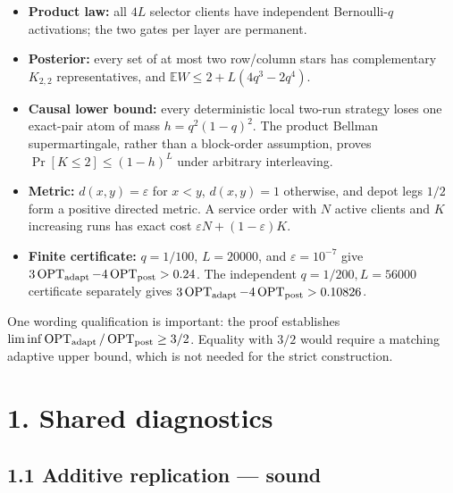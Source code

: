 \documentclass[11pt,a4paper]{article}
\begin{document}
\begin{itemize}

\item \textbf{Product law:} all \(4L\) selector clients have independent Bernoulli-\(q\) activations; the two gates per layer are permanent.

\item \textbf{Posterior:} every set of at most two row/column stars has complementary \(K_{2,2}\) representatives, and \(\mathbb E W\le2+L(4q^3-2q^4)\).

\item \textbf{Causal lower bound:} every deterministic local two-run strategy loses one exact-pair atom of mass \(h=q^2(1-q)^2\).  The product Bellman supermartingale, rather than a block-order assumption, proves \(\Pr[K\le2]\le(1-h)^L\) under arbitrary interleaving.

\item \textbf{Metric:} \(d(x,y)=\varepsilon\) for \(x<y\), \(d(x,y)=1\) otherwise, and depot legs \(1/2\) form a positive directed metric.  A service order with \(N\) active clients and \(K\) increasing runs has exact cost \(\varepsilon N+(1-\varepsilon)K\).

\item \textbf{Finite certificate:} \(q=1/100\), \(L=20000\), and \(\varepsilon=10^{-7}\) give \(3\operatorname{OPT}_{\rm adapt} -4\operatorname{OPT}_{\rm post}>0.24\).  The independent \(q=1/200,L=56000\) certificate separately gives \(3\operatorname{OPT}_{\rm adapt} -4\operatorname{OPT}_{\rm post}>0.10826\).

\end{itemize}

One wording qualification is important: the proof establishes \(\liminf \operatorname{OPT}_{\rm adapt}/\operatorname{OPT}_{\rm post} \ge3/2\).  Equality with \(3/2\) would require a matching adaptive upper bound, which is not needed for the strict construction.


\section*{1. Shared diagnostics}

\subsection*{1.1 Additive replication — sound}
\end{document}
